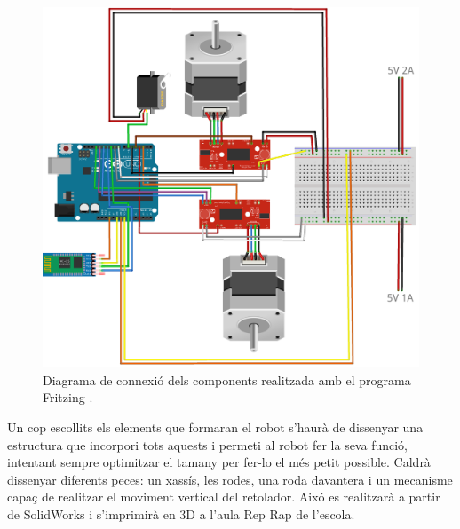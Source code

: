 \begin{figure}[H]
	\centering
	\includegraphics[scale=0.4]{RobotFritz}
	\caption{Diagrama de connexió dels components realitzada amb el programa Fritzing \cite{FritzingBib}.}
	\label{fig:connexio1}
\end{figure}

Un cop escollits els elements que formaran el robot s'haurà de dissenyar una estructura que incorpori tots aquests i permeti al robot fer la seva funció, intentant sempre optimitzar el tamany per fer-lo el més petit possible. Caldrà dissenyar diferents peces: un xassís, les rodes, una roda davantera i un mecanisme capaç de realitzar el moviment vertical del retolador. Aixó es realitzarà a partir de SolidWorks i s'imprimirà en 3D a l'aula Rep Rap de l'escola. 

